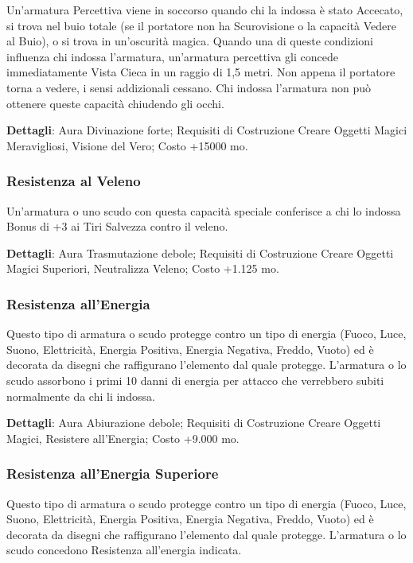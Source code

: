 \begin{multicols}{2}
Un'armatura Percettiva viene in soccorso quando chi la indossa è stato Accecato, si trova nel buio totale (se il portatore non ha Scurovisione o la capacità Vedere al Buio), o si trova in un'oscurità magica. Quando una di queste condizioni influenza chi indossa l'armatura, un'armatura percettiva gli concede immediatamente Vista Cieca in un raggio di 1,5 metri. Non appena il portatore torna a vedere, i sensi addizionali cessano. Chi indossa l'armatura non può ottenere queste capacità chiudendo gli occhi.

\textbf{Dettagli}: Aura Divinazione forte; Requisiti di Costruzione Creare Oggetti Magici Meravigliosi, Visione del Vero; Costo +15000 mo.

\subsubsection{Resistenza al Veleno}

Un'armatura o uno scudo con questa capacità speciale conferisce a chi lo indossa Bonus di +3 ai Tiri Salvezza contro il veleno.

\textbf{Dettagli}: Aura Trasmutazione debole; Requisiti di Costruzione Creare Oggetti Magici Superiori, Neutralizza Veleno; Costo +1.125 mo.

\subsubsection{Resistenza all'Energia}

Questo tipo di armatura o scudo protegge contro un tipo di energia (Fuoco, Luce, Suono, Elettricità, Energia Positiva, Energia Negativa, Freddo, Vuoto) ed è decorata da disegni che raffigurano l'elemento dal quale protegge. L'armatura o lo scudo assorbono i primi 10 danni di energia per attacco che verrebbero subiti normalmente da chi li indossa.

\textbf{Dettagli}: Aura Abiurazione debole; Requisiti di Costruzione Creare Oggetti Magici, Resistere all'Energia; Costo +9.000 mo.

\subsubsection{Resistenza all'Energia Superiore}

Questo tipo di armatura o scudo protegge contro un tipo di energia (Fuoco, Luce, Suono, Elettricità, Energia Positiva, Energia Negativa, Freddo, Vuoto) ed è decorata da disegni che raffigurano l'elemento dal quale protegge. L'armatura o lo scudo concedono Resistenza all'energia indicata.


\end{multicols}
